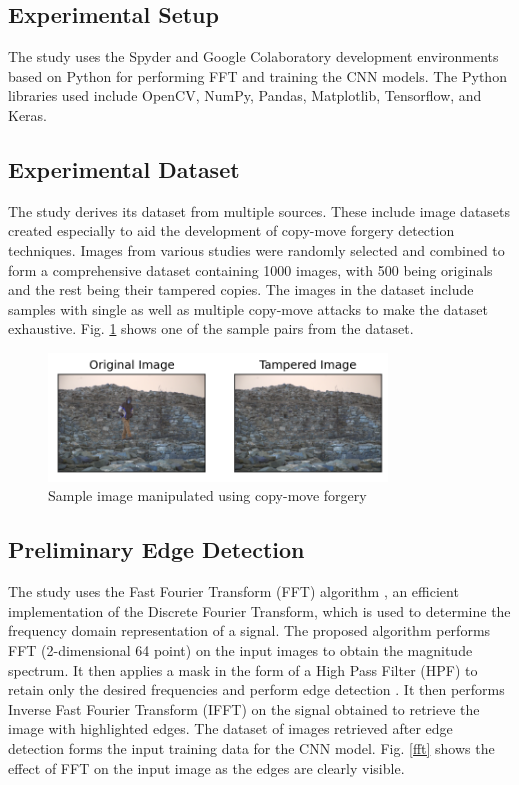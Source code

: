 \documentclass[conference]{IEEEtran}
\begin{document}
\subsection{Experimental Setup}
The study uses the Spyder and Google Colaboratory development environments based on Python for performing FFT and training the CNN models. The Python libraries used include OpenCV, NumPy, Pandas, Matplotlib, Tensorflow, and Keras.  

\subsection{Experimental Dataset}
The study derives its dataset from multiple sources. These include image datasets created especially to aid the development of copy-move forgery detection techniques. Images from various studies \cite{b4}  \cite{b5} \cite{b7} were randomly selected and combined to form a comprehensive dataset containing 1000 images, with 500 being originals and the rest being their tampered copies. The images in the dataset include samples with single as well as multiple copy-move attacks to make the dataset exhaustive. Fig. \ref{tampered} shows one of the sample pairs from the dataset.

\begin{figure}[htpb]
\centerline{\includegraphics[width = 9cm]{tamp_up.png}}
\caption{Sample image manipulated using copy-move forgery}
\label{tampered}
\end{figure}

\subsection{Preliminary Edge Detection}
The study uses the Fast Fourier Transform (FFT) algorithm \cite{b10}, an efficient implementation of the Discrete Fourier Transform, which is used to determine the frequency domain representation of a signal. The proposed algorithm performs FFT (2-dimensional 64 point) on the input images to obtain the magnitude spectrum. It then applies a mask in the form of a High Pass Filter (HPF) to retain only the desired frequencies and perform edge detection \cite{b15}. It then performs Inverse Fast Fourier Transform (IFFT) on the signal obtained to retrieve the image with highlighted edges. The dataset of images retrieved after edge detection forms the input training data for the CNN model. Fig. \ref{fft} shows the effect of FFT on the input image as the edges are clearly visible.
\end{document}
